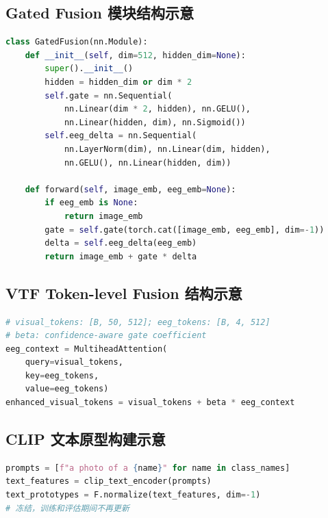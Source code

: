 \subsection{Gated Fusion 模块结构示意}

\begin{lstlisting}[language=Python,caption={Gated Residual Fusion 结构示意代码}]
class GatedFusion(nn.Module):
    def __init__(self, dim=512, hidden_dim=None):
        super().__init__()
        hidden = hidden_dim or dim * 2
        self.gate = nn.Sequential(
            nn.Linear(dim * 2, hidden), nn.GELU(),
            nn.Linear(hidden, dim), nn.Sigmoid())
        self.eeg_delta = nn.Sequential(
            nn.LayerNorm(dim), nn.Linear(dim, hidden),
            nn.GELU(), nn.Linear(hidden, dim))

    def forward(self, image_emb, eeg_emb=None):
        if eeg_emb is None:
            return image_emb
        gate = self.gate(torch.cat([image_emb, eeg_emb], dim=-1))
        delta = self.eeg_delta(eeg_emb)
        return image_emb + gate * delta
\end{lstlisting}

\subsection{VTF Token-level Fusion 结构示意}

\begin{lstlisting}[language=Python,caption={VTF Token-level Fusion 结构示意代码}]
# visual_tokens: [B, 50, 512]; eeg_tokens: [B, 4, 512]
# beta: confidence-aware gate coefficient
eeg_context = MultiheadAttention(
    query=visual_tokens,
    key=eeg_tokens,
    value=eeg_tokens)
enhanced_visual_tokens = visual_tokens + beta * eeg_context
\end{lstlisting}

\subsection{CLIP 文本原型构建示意}

\begin{lstlisting}[language=Python,caption={CLIP 文本原型预计算示意代码}]
prompts = [f"a photo of a {name}" for name in class_names]
text_features = clip_text_encoder(prompts)
text_prototypes = F.normalize(text_features, dim=-1)
# 冻结，训练和评估期间不再更新
\end{lstlisting}
